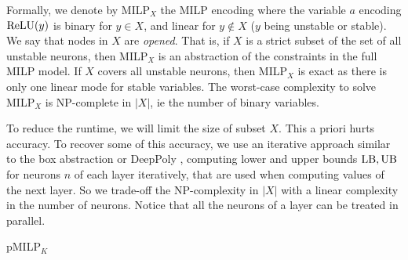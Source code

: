 Formally, we denote by MILP$_X$ the MILP encoding where the variable $a$ encoding $\mathrm{ReLU}(y)$ is binary for $y\in X$, and linear for $y\notin X$ ($y$ being unstable or stable). 
We say that nodes in $X$ are {\em opened}. 
That is, if $X$ is a strict subset of the set of all unstable neurons, then 
MILP$_X$ is an abstraction of the constraints in the full MILP model. If $X$ covers all unstable neurons, then MILP$_X$ is exact as there is only one linear mode for stable variables. The worst-case complexity to solve MILP$_X$ is NP-complete in $|X|$, ie the number of binary variables.

\smallskip

To reduce the runtime, we will limit the size of subset $X$. This a priori hurts accuracy. To recover some of this accuracy, we use an iterative approach similar to the box abstraction or DeepPoly \cite{deeppoly}, computing lower and upper bounds $\mathrm{LB},\mathrm{UB}$ for neurons $n$ of {each layer} iteratively, that are used when computing values of the next layer.
So we trade-off the NP-complexity in $|X|$ with a linear complexity in the number of neurons. Notice that all the neurons of a layer can be treated in parallel.


\medskip




\begin{algorithm}[t!]
	\caption{pMILP$_K$}
	\label{algo1}
	
	
\end{algorithm}	


